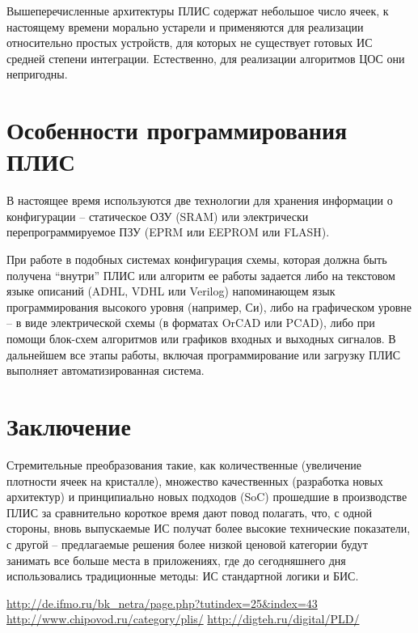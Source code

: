 Вышеперечисленные архитектуры ПЛИС содержат небольшое число ячеек, к настоящему
времени морально устарели и применяются для реализации относительно простых
устройств, для которых не существует готовых ИС средней степени интеграции.
Естественно, для реализации алгоритмов ЦОС они непригодны.

\vspace*{2em} %

\section{Особенности программирования ПЛИС}

В настоящее время используются две технологии для
хранения информации о конфигурации -- статическое ОЗУ (SRAM) или электрически
перепрограммируемое ПЗУ (EPRM или EEPROM или FLASH).

При работе в подобных системах конфигурация схемы, которая должна быть получена
``внутри'' ПЛИС или алгоритм ее работы задается либо на текстовом языке
описаний (ADHL, VDHL или Verilog) напоминающем язык программирования высокого
уровня (например, Си), либо на графическом уровне -- в виде электрической схемы
(в форматах OrCAD или PCAD), либо при помощи блок-схем алгоритмов или графиков
входных и выходных сигналов. В дальнейшем все этапы работы, включая
программирование или загрузку ПЛИС выполняет автоматизированная система.

\vspace*{2em} %

\section*{Заключение}

Стремительные преобразования такие, как количественные (увеличение плотности
ячеек на кристалле), множество качественных (разработка новых архитектур) и
принципиально новых подходов (SoC) прошедшие в производстве ПЛИС за
сравнительно короткое время дают повод полагать, что, с одной стороны, вновь
выпускаемые ИС получат более высокие технические показатели, с другой --
предлагаемые решения более низкой ценовой категории будут занимать все больше
места в приложениях, где до сегодняшнего дня использовались традиционные
методы: ИС стандартной логики и БИС.

\vspace*{2em} %
\renewcommand{\bibname}{Список источников}

\begin{thebibliography}{9} 
     \href{http://de.ifmo.ru/bk_netra/page.php?tutindex=25&index=43}
    {http://de.ifmo.ru/bk\_netra/page.php?tutindex=25\&index=43}
     \href{http://www.chipovod.ru/category/plis/}
    {http://www.chipovod.ru/category/plis/}
     \href{http://digteh.ru/digital/PLD/}
    {http://digteh.ru/digital/PLD/}
\end{thebibliography}